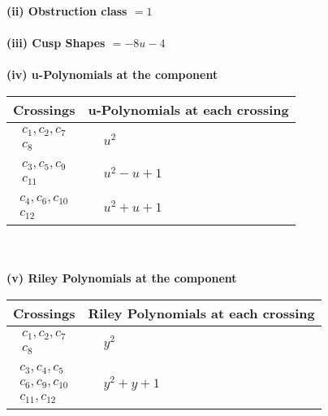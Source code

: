 \documentclass[1p]{elsarticle_modified}
\theoremstyle{definition}
\begin{document}
\flushleft \textbf{(ii) Obstruction class $= 1$}\\~\\
\flushleft \textbf{(iii) Cusp Shapes $= -8 u-4$}\\~\\
\newpage\renewcommand{\arraystretch}{1}
\flushleft \textbf{(iv) u-Polynomials at the component}\newline \\
\begin{tabular}{m{50pt}|m{274pt}}
Crossings & \hspace{64pt}u-Polynomials at each crossing \\
\hline $$\begin{aligned}c_{1},c_{2},c_{7}\\c_{8}\end{aligned}$$&$\begin{aligned}
&u^2
\end{aligned}$\\
\hline $$\begin{aligned}c_{3},c_{5},c_{9}\\c_{11}\end{aligned}$$&$\begin{aligned}
&u^2- u+1
\end{aligned}$\\
\hline $$\begin{aligned}c_{4},c_{6},c_{10}\\c_{12}\end{aligned}$$&$\begin{aligned}
&u^2+u+1
\end{aligned}$\\
\hline
\end{tabular}\\~\\
\newpage\renewcommand{\arraystretch}{1}
\flushleft \textbf{(v) Riley Polynomials at the component}\newline \\
\begin{tabular}{m{50pt}|m{274pt}}
Crossings & \hspace{64pt}Riley Polynomials at each crossing \\
\hline $$\begin{aligned}c_{1},c_{2},c_{7}\\c_{8}\end{aligned}$$&$\begin{aligned}
&y^2
\end{aligned}$\\
\hline $$\begin{aligned}c_{3},c_{4},c_{5}\\c_{6},c_{9},c_{10}\\c_{11},c_{12}\end{aligned}$$&$\begin{aligned}
&y^2+y+1
\end{aligned}$\\
\hline
\end{tabular}\\~\\
\end{document}
